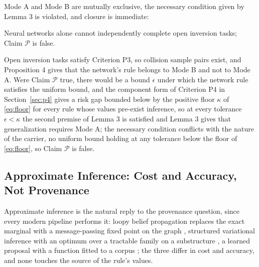 Mode A and Mode B are mutually exclusive, the necessary condition given by Lemma 3 is violated, and closure is immediate:

\begin{theorem}
Neural networks alone cannot independently complete open inversion tasks; Claim $\mathcal{P}$ is false.
\end{theorem}

\argument Open inversion tasks satisfy Criterion P3, so collision sample pairs exist, and Proposition 4 gives that the network's rule belongs to Mode B and not to Mode A. Were Claim $\mathcal{P}$ true, there would be a bound $\epsilon$ under which the network rule satisfies the uniform bound, and the component form of Criterion P4 in Section~\ref{sec:p4} gives a risk gap bounded below by the positive floor $\kappa$ of \eqref{eq:floor} for every rule whose values pre-exist inference, so at every tolerance $\epsilon < \kappa$ the second premise of Lemma 3 is satisfied and Lemma 3 gives that generalization requires Mode A; the necessary condition conflicts with the nature of the carrier, no uniform bound holding at any tolerance below the floor of \eqref{eq:floor}, so Claim $\mathcal{P}$ is false.\qedbox

\subsection{Approximate Inference: Cost and Accuracy, Not Provenance}

Approximate inference is the natural reply to the provenance question, since every modern pipeline performs it: loopy belief propagation replaces the exact marginal with a message-passing fixed point on the graph \citep{pearl1988,murphy1999,yedidia2005}, structured variational inference with an optimum over a tractable family on a substructure \citep{saul1996,wainwright2008}, a learned proposal with a function fitted to a corpus \citep{mnih2014}; the three differ in cost and accuracy, and none touches the source of the rule's values.

